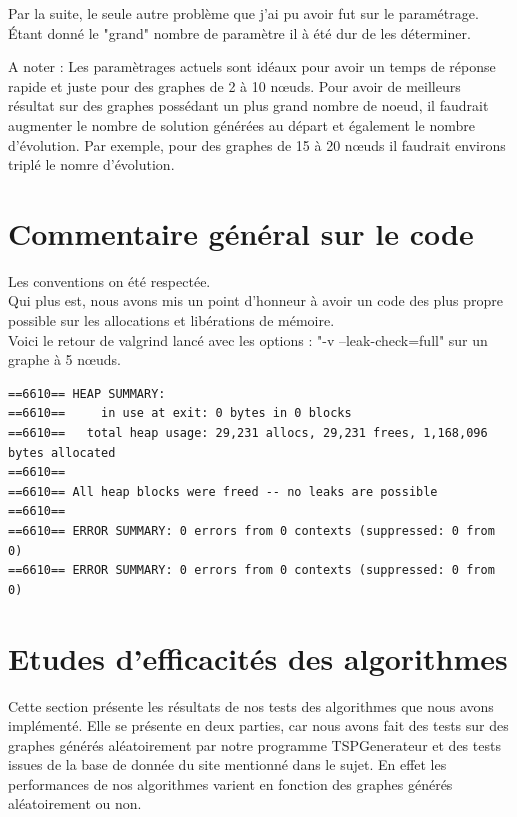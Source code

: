 \documentclass[10pt,a4paper]{report}
\begin{document}
		Par la suite, le seule autre problème que j'ai pu avoir fut sur le paramétrage. 
		Étant donné le "grand" nombre de paramètre il à été dur de les déterminer.
		
		A noter : Les paramètrages actuels sont idéaux pour avoir un temps de réponse rapide et juste pour des graphes de 2 à 10 nœuds.
		Pour avoir de meilleurs résultat sur des graphes possédant un plus grand nombre de noeud, il faudrait augmenter le nombre de solution générées au départ 
		et également le nombre d'évolution.
		Par exemple, pour des graphes de 15 à 20 nœuds il faudrait environs triplé le nomre d'évolution.

\newpage	

\section{Commentaire général sur le code}

\begin{flushleft}
Les conventions on été respectée. \\
Qui plus est, nous avons mis un point d'honneur à avoir un code des plus propre possible sur les allocations et libérations de mémoire. \\

Voici le retour de valgrind lancé avec les options : "-v --leak-check=full" sur un graphe à 5 nœuds. \\
\end{flushleft}
\begin{verbatim}
==6610== HEAP SUMMARY:
==6610==     in use at exit: 0 bytes in 0 blocks
==6610==   total heap usage: 29,231 allocs, 29,231 frees, 1,168,096 bytes allocated
==6610== 
==6610== All heap blocks were freed -- no leaks are possible
==6610== 
==6610== ERROR SUMMARY: 0 errors from 0 contexts (suppressed: 0 from 0)
==6610== ERROR SUMMARY: 0 errors from 0 contexts (suppressed: 0 from 0)
\end{verbatim}



\newpage
\section{Etudes d'efficacités des algorithmes}
	\begin{flushleft}
	Cette section présente les résultats de nos tests des algorithmes que nous avons implémenté. Elle se présente en deux parties, car nous avons fait des tests sur des graphes générés aléatoirement par notre programme TSPGenerateur et des tests issues de la base de donnée du site mentionné dans le sujet. En effet les performances de nos algorithmes varient en fonction des graphes générés aléatoirement ou non.
	\end{flushleft}
\end{document}
